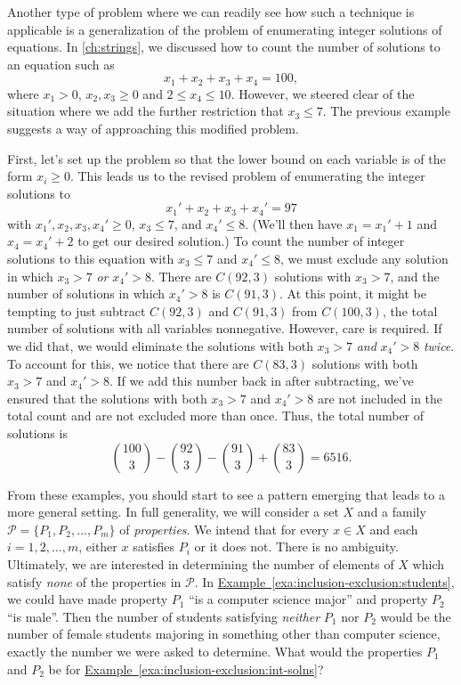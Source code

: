 \begin{example}\label{exa:inclusion-exclusion:int-solns}
  Another type of problem where we can readily see how such a
  technique is applicable is a generalization of the problem of
  enumerating integer solutions of equations. In \autoref{ch:strings},
  we discussed how to count the number of solutions to an equation
  such as
  \[x_1 + x_2 + x_3 + x_4 = 100,\] where $x_1>0$, $x_2, x_3 \geq 0$
  and $2\leq x_4\leq 10$. However, we steered clear of the situation
  where we add the further restriction that $x_3\leq 7$. The previous
  example suggests a way of approaching this modified problem.

  First, let's set up the problem so that the lower bound on each
  variable is of the form $x_i\geq 0$. This leads us
  to the revised problem of enumerating the integer solutions to
  \[x_1' + x_2 + x_3 + x_4' = 97\] with $x_1',x_2,x_3,x_4'\geq 0$,
  $x_3\leq 7$, and $x_4'\leq 8$. (We'll then have $x_1 = x_1'+1$ and
  $x_4 = x_4' + 2$ to get our desired solution.) To count the number
  of integer solutions to this equation with $x_3\leq 7$ and $x_4'\leq
  8$, we must exclude any solution in which $x_3 > 7$ \emph{or} $x_4'
  > 8$. There are $C(92,3)$ solutions with $x_3 > 7$, and the number
  of solutions in which $x_4'>8$ is $C(91,3)$. At this point, it might
  be tempting to just subtract $C(92,3)$ and $C(91,3)$ from
  $C(100,3)$, the total number of solutions with all variables
  nonnegative. However, care is required. If we did that, we would
  eliminate the solutions with both $x_3>7$ \emph{and} $x_4'>8$
  \emph{twice}. To account for this, we notice that there are
  $C(83,3)$ solutions with both $x_3>7$ and $x_4'>8$. If we add this
  number back in after subtracting, we've ensured that the solutions
  with both $x_3>7$ and $x_4'>8$ are not included in the total count
  and are not excluded more than once. Thus, the total number of
  solutions is 
  \[\binom{100}{3} - \binom{92}{3} - \binom{91}{3} + \binom{83}{3} = 6516.\]
\end{example}

From these examples, you should start to see a pattern emerging that
leads to a more general setting. In full generality, we will consider
a set $X$ and a family $\mathcal{P}=\{P_1,P_2,\dots,P_m\}$ of
\textit{properties}.  We intend that for every $x\in X$ and each
$i=1,2,\dots,m$, either $x$ satisfies $P_i$ or it does not.  There is
no ambiguity.  Ultimately, we are interested in determining the number
of elements of $X$ which satisfy \textit{none} of the properties in
$\mathcal{P}$. In
\hyperref[exa:inclusion-exclusion:students]{Example~\ref*{exa:inclusion-exclusion:students}},
we could have made property $P_1$ ``is a computer science major'' and
property $P_2$ ``is male''. Then the number of students satisfying
\emph{neither} $P_1$ nor $P_2$ would be the number of female students
majoring in something other than computer science, exactly the number
we were asked to determine. What would the properties $P_1$ and $P_2$
be for
\hyperref[exa:inclusion-exclusion:int-solns]{Example~\ref*{exa:inclusion-exclusion:int-solns}}?


